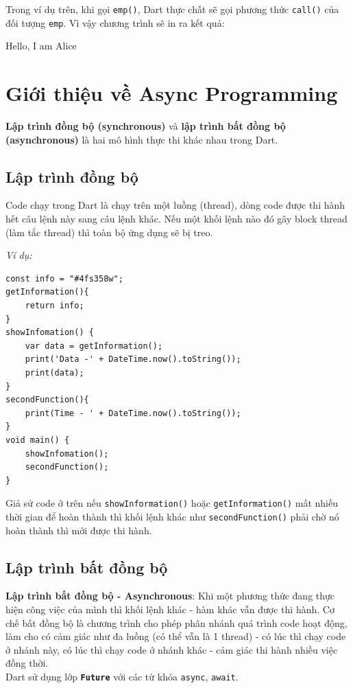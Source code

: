 \documentclass[../DoAn.tex]{subfiles}
\numberwithin{figure}{chapter}
\begin{document}
Trong ví dụ trên, khi gọi \verb|emp()|, Dart thực chất sẽ gọi phương thức \verb|call()| của đối tượng \verb|emp|. Vì vậy chương trình sẽ in ra kết quả:
\begin{myverbatim}
    Hello, I am Alice
\end{myverbatim}

\section{Giới thiệu về Async Programming}
\textbf{Lập trình đồng bộ (synchronous)} và \textbf{lập trình bất đồng bộ (asynchronous)} là hai mô hình thực thi khác nhau trong Dart.
\subsection{Lập trình đồng bộ}
Code chạy trong Dart là chạy trên một luồng (thread), dòng code được thi hành hết câu lệnh này sang câu lệnh khác. Nếu một khối lệnh nào đó gây block thread (làm tắc thread) thì toàn bộ ứng dụng sẽ bị treo. 

\textit{Ví dụ:}

\begin{lstlisting} 
const info = "#4fs358w";
getInformation(){
    return info;
}
showInfomation() { 
    var data = getInformation();
    print('Data -' + DateTime.now().toString());
    print(data);
} 
secondFunction(){
    print(Time - ' + DateTime.now().toString());
}
void main() { 
    showInfomation(); 
    secondFunction();
} 
\end{lstlisting}

Giả sử code ở trên nếu \verb|showInformation()| hoặc \verb|getInformation()| mất nhiều thời gian để hoàn thành thì khối lệnh khác như \verb|secondFunction()| phải chờ nó hoàn thành thì mới được thi hành.
\subsection{Lập trình bất đồng bộ}
\textbf{Lập trình bất đồng bộ - Asynchronous}: Khi một phương thức đang thực hiện công việc của mình thì khối lệnh khác - hàm khác vẫn được thi hành. Cơ chế bất đồng bộ là chương trình cho phép phân nhánh quá
trình code hoạt động, làm cho có cảm giác như đa luồng (có thể
vẫn là 1 thread) - có lúc thì chạy code ở nhánh này, có lúc thì
chạy code ở nhánh khác - cảm giác thi hành nhiều việc đồng thời. \\
Dart sử dụng lớp \textbf{\texttt{Future}} với các từ khóa \texttt{async}, \texttt{await}.  
\end{document}
